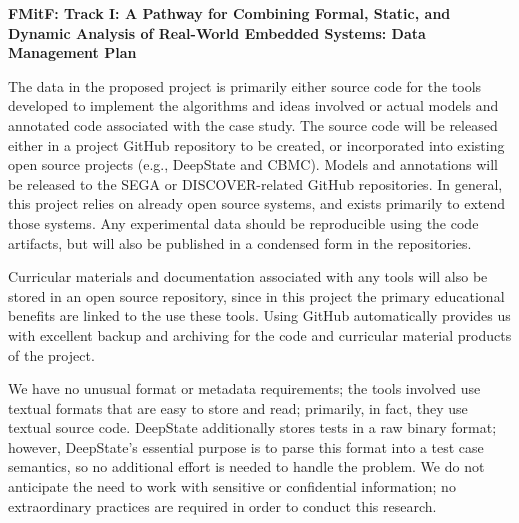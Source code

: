 \documentclass[12pt]{article}
\begin{document}

\begin{center}
  {\Large\sf\textbf{FMitF: Track I: A Pathway for Combining Formal, Static, and
  Dynamic Analysis of Real-World Embedded Systems: Data Management Plan}}
\end{center}

The data in the proposed project is primarily either source code for
the tools developed to implement the algorithms and ideas involved or
actual models and annotated code associated with the case study.  The source code will be released either in a project GitHub repository to be created, or incorporated into existing open source projects (e.g., DeepState and CBMC).  Models and annotations will be released to the SEGA or DISCOVER-related GitHub repositories.  In general, this project relies on already open source systems, and exists primarily to extend those systems.  Any experimental data should be reproducible using the code artifacts, but will also be published in a condensed form in the repositories.

Curricular
materials and documentation associated with any tools will also be stored in
an open source repository, since in this project the primary
educational benefits are linked to the use these tools.  Using GitHub automatically provides us with excellent backup
and archiving for the code and curricular material products of the
project.

We have no unusual format or metadata requirements; the
tools involved use textual formats that are easy to store and read;
primarily, in fact, they use textual source code.  DeepState additionally stores tests in a raw binary format; however, DeepState's essential purpose is to parse this format into a test case semantics, so no additional effort is needed to handle the problem.  
We do not anticipate the need to work with sensitive or confidential
information; no extraordinary practices are required in order to
conduct this research.
\end{document}
